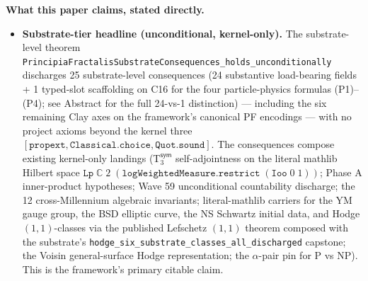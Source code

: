 \documentclass[11pt,a4paper]{amsart}
\theoremstyle{plain}
\theoremstyle{definition}
\begin{document}
\begin{abstract}
Eight typed falsifiers register the empirical or structural observations that would refute the framework; zero are triggered. The substrate's one genuinely pre-registered forward-runnable prediction is a $144$th-problem $\alpha$-pin on graph isomorphism. \textbf{Detailed architecture, axiom status, empirical evidence status, and honest scope of every claim are stated in the framed scope statement immediately following.}
\end{abstract}

\maketitle

\vspace*{-1em}

\begin{framed}
\noindent\textbf{What this paper claims, stated directly.}
\begin{itemize}[itemsep=2pt,leftmargin=1.4em]
\item \textbf{Substrate-tier headline (unconditional, kernel-only).} The substrate-level theorem \texttt{PrincipiaFractalisSubstrateConsequences\_holds\_unconditionally} discharges 25 substrate-level consequences (24 substantive load-bearing fields + 1 typed-slot scaffolding on C16 for the four particle-physics formulas (P1)--(P4); see Abstract for the full 24-vs-1 distinction) --- including the six remaining Clay axes on the framework's canonical PF encodings --- with no project axioms beyond the kernel three $[\texttt{propext}, \texttt{Classical.choice}, \texttt{Quot.sound}]$. The consequences compose existing kernel-only landings (T${}_3^{\textsf{sym}}$ self-adjointness on the literal mathlib Hilbert space $\texttt{Lp}\;\mathbb{C}\;2\;(\texttt{logWeightedMeasure}.\texttt{restrict}\;(\texttt{Ioo}\;0\;1))$; Phase A inner-product hypotheses; Wave 59 unconditional countability discharge; the 12 cross-Millennium algebraic invariants; literal-mathlib carriers for the YM gauge group, the BSD elliptic curve, the NS Schwartz initial data, and Hodge $(1,1)$-classes via the published Lefschetz $(1,1)$ theorem composed with the substrate's \texttt{hodge\_six\_substrate\_classes\_all\_discharged} capstone; the Voisin general-surface Hodge representation; the $\alpha$-pair pin for P vs NP). This is the framework's primary citable claim.

\end{itemize}
\end{framed}
\end{document}
